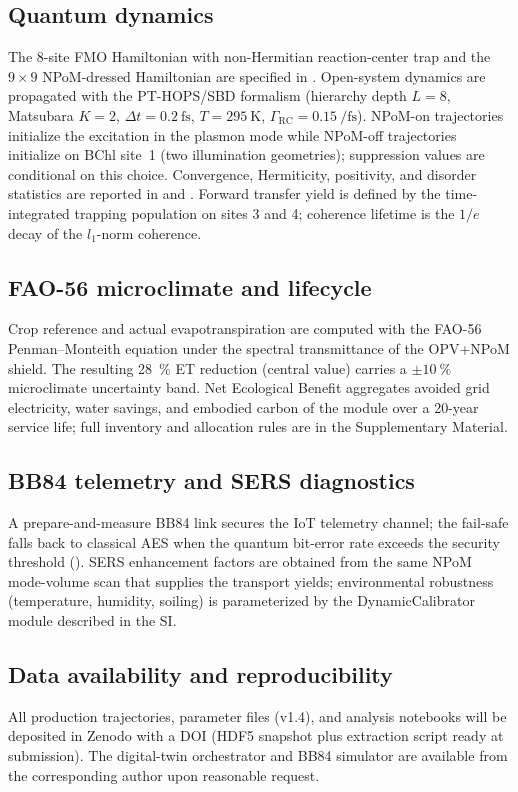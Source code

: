 \documentclass[preprint,12pt]{elsarticle}
\begin{document}
\subsection{Quantum dynamics}
The 8-site FMO Hamiltonian with non-Hermitian reaction-center trap and the $9\times 9$ NPoM-dressed Hamiltonian are specified in . Open-system dynamics are propagated with the PT-HOPS/SBD formalism (hierarchy depth $L=8$, Matsubara $K=2$, $\Delta t=\qty{0.2}{\fs}$, $T=\qty{295}{\kelvin}$, $\Gamma_{\mathrm{RC}}=\qty{0.15}{\per\fs}$). NPoM-on trajectories initialize the excitation in the plasmon mode while NPoM-off trajectories initialize on BChl site~1 (two illumination geometries); suppression values are conditional on this choice. Convergence, Hermiticity, positivity, and disorder statistics are reported in  and . Forward transfer yield is defined by the time-integrated trapping population on sites 3 and 4; coherence lifetime is the $1/e$ decay of the $l_1$-norm coherence.

\subsection{FAO-56 microclimate and lifecycle}
Crop reference and actual evapotranspiration are computed with the FAO-56 Penman--Monteith equation under the spectral transmittance of the OPV+NPoM shield. The resulting \qty{28}{\percent} ET reduction (central value) carries a $\pm\qty{10}{\percent}$ microclimate uncertainty band. Net Ecological Benefit aggregates avoided grid electricity, water savings, and embodied carbon of the module over a 20-year service life; full inventory and allocation rules are in the Supplementary Material.

\subsection{BB84 telemetry and SERS diagnostics}
A prepare-and-measure BB84 link secures the IoT telemetry channel; the fail-safe falls back to classical AES when the quantum bit-error rate exceeds the security threshold (). SERS enhancement factors are obtained from the same NPoM mode-volume scan that supplies the transport yields; environmental robustness (temperature, humidity, soiling) is parameterized by the DynamicCalibrator module described in the SI.

\subsection*{Data availability and reproducibility}
All production trajectories, parameter files (v1.4), and analysis notebooks will be deposited in Zenodo with a DOI (HDF5 snapshot plus extraction script ready at submission). The digital-twin orchestrator and BB84 simulator are available from the corresponding author upon reasonable request.
\end{document}
